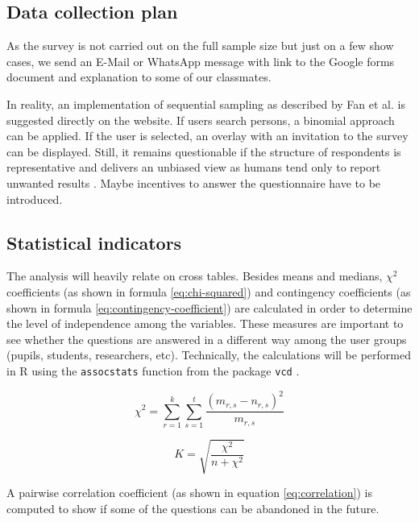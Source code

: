 \documentclass[12pt,a4paper,paper=a4,oneside,titlepage,pdftex]{scrartcl}
\begin{document}
\subsection{Data collection plan}
As the survey is not carried out on the full sample size but just on a few show cases, we send an E-Mail or WhatsApp message with link to the Google forms document and explanation to some of our classmates.

In reality, an implementation of sequential sampling as described by Fan et al. \citep{fan1962development} is suggested directly on the website. If users search persons, a binomial approach can be applied. If the user is selected, an overlay with an invitation to the survey can be displayed. Still, it remains questionable if the structure of respondents is representative and delivers an unbiased view as humans tend only to report unwanted results \citep{bergstrand1983bias}. Maybe incentives to answer the questionnaire have to be introduced.

\subsection{Statistical indicators}
The analysis will heavily relate on cross tables. Besides means and medians, $\chi^2$ coefficients \citep{doi:10.1080/14786440009463897} (as shown in formula \ref{eq:chi-squared}) and contingency coefficients \citep{pearson1930theory} (as shown in formula \ref{eq:contingency-coefficient}) are calculated in order to determine the level of independence among the variables. These measures are important to see whether the questions are answered in a different way among the user groups (pupils, students, researchers, etc). Technically, the calculations will be performed in R using the \verb|assocstats| function from the package \verb|vcd| \citep{vcd2006}.

\begin{equation}
\chi^2 = \sum_{r=1}^{k}\sum_{s=1}^{t}\frac{(m_{r,s}-n_{r,s})^2}{m_{r,s}}
\label{eq:chi-squared}
\end{equation}

\begin{equation}
K = \sqrt{\frac{\chi^2}{n+\chi^2}}
\label{eq:contingency-coefficient}
\end{equation}

A pairwise correlation coefficient \citep{lee1988thirteen} (as shown in equation \ref{eq:correlation}) is computed to show if some of the questions can be abandoned in the future.
\end{document}
